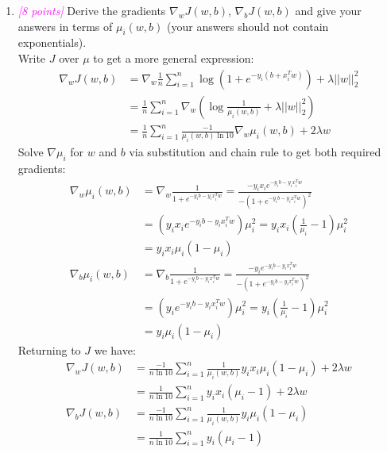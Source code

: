 \documentclass{article}
\newcommand{\1}{\mathbf{1}}
\newcommand{\points}[1]{\small\textcolor{magenta}{\emph{[#1 points]}} \normalsize}
\begin{document}
\begin{enumerate}
    \item \points{8} Derive the gradients $\nabla_wJ(w,b)$, $\nabla_bJ(w,b)$ and give your answers in terms of $\mu_i(w,b)$  (your answers should not contain exponentials). \\
    Write $J$ over $\mu$ to get a more general expression:
    \begin{align*}
        \nabla_w J(w,b) &= \nabla_w \frac{1}{n} \sum_{i=1}^n \log{\left( 1 + e^{-y_i(b+x^T_iw)} \right)} + \lambda||w||^2_2 \\
        &= \frac{1}{n} \sum_{i=1}^n \nabla_w \left(\log{\frac{1}{\mu_i(w,b)}} + \lambda||w||^2_2\right) \\
        &= \frac{1}{n} \sum_{i=1}^n \frac{-1}{\mu_i(w,b)\ln{10}} \nabla_w \mu_i(w,b) + 2\lambda w
    \end{align*}{}
    Solve $\nabla \mu_i$ for $w$ and $b$ via substitution and chain rule to get both required gradients:
    \begin{align*}
        \nabla_w \mu_i(w,b) &= \nabla_w \frac{1}{1+e^{-y_ib-y_ix^T_iw}} = \frac{-y_ix_i e^{-y_ib - y_ix^T_iw}}{-\left(1+e^{-y_ib - y_ix^T_iw}\right)^2} \\
        & = \left(y_ix_i e^{-y_ib - y_ix^T_iw} \right)\mu_i^2 = y_i x_i \left(\frac{1}{\mu_i} -1 \right)\mu_i^2 \\
        & = y_ix_i \mu_i(1-\mu_i)\\
        \nabla_b \mu_i(w,b) &= \nabla_b \frac{1}{1+e^{-y_ib-y_ix^T_iw}} = \frac{-y_i e^{-y_ib - y_ix^T_iw}}{-\left(1+e^{-y_ib - y_ix^T_iw}\right)^2} \\
        & = \left(y_i e^{-y_ib - y_ix^T_iw} \right)\mu_i^2 = y_i \left(\frac{1}{\mu_i} -1 \right)\mu_i^2 \\
        & = y_i \mu_i(1-\mu_i)
    \end{align*}{}
    Returning to $J$ we have:
    \begin{align*}
        \nabla_w J(w,b) &= \frac{-1}{n\ln{10}} \sum_{i=1}^n \frac{1}{\mu_i(w,b)} y_ix_i \mu_i(1-\mu_i) + 2\lambda w \\
        & = \frac{1}{n\ln{10}} \sum_{i=1}^n y_ix_i (\mu_i - 1) + 2\lambda w \\
        \nabla_b J(w,b) &= \frac{-1}{n\ln{10}} \sum_{i=1}^n \frac{1}{\mu_i(w,b)} y_i \mu_i(1-\mu_i) \\
        & = \frac{1}{n\ln{10}} \sum_{i=1}^n y_i (\mu_i - 1)
    \end{align*}{}
    

\end{enumerate}
\end{document}
